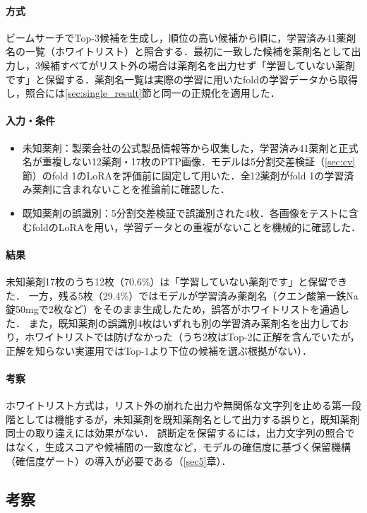 \documentclass[dvipdfmx]{jsarticle}
\begin{document}
\paragraph{方式}
ビームサーチでTop-3候補を生成し，順位の高い候補から順に，学習済み41薬剤名の一覧（ホワイトリスト）と照合する．最初に一致した候補を薬剤名として出力し，3候補すべてがリスト外の場合は薬剤名を出力せず「学習していない薬剤です」と保留する．薬剤名一覧は実際の学習に用いたfoldの学習データから取得し，照合には\ref{sec:single_result}節と同一の正規化を適用した．

\paragraph{入力・条件}
\begin{itemize}
  \item 未知薬剤：製薬会社の公式製品情報等から収集した，学習済み41薬剤と正式名が重複しない12薬剤・17枚のPTP画像．モデルは5分割交差検証（\ref{sec:cv}節）のfold 1のLoRAを評価前に固定して用いた．全12薬剤がfold 1の学習済み薬剤に含まれないことを推論前に確認した．
  \item 既知薬剤の誤識別：5分割交差検証で誤識別された4枚．各画像をテストに含むfoldのLoRAを用い，学習データとの重複がないことを機械的に確認した．
\end{itemize}

\paragraph{結果}
未知薬剤17枚のうち12枚（70.6\%）は「学習していない薬剤です」と保留できた．
一方，残る5枚（29.4\%）ではモデルが学習済み薬剤名（クエン酸第一鉄Na錠50mgで2枚など）をそのまま生成したため，誤答がホワイトリストを通過した．
また，既知薬剤の誤識別4枚はいずれも別の学習済み薬剤名を出力しており，ホワイトリストでは防げなかった（うち2枚はTop-2に正解を含んでいたが，正解を知らない実運用ではTop-1より下位の候補を選ぶ根拠がない）．

\paragraph{考察}
ホワイトリスト方式は，リスト外の崩れた出力や無関係な文字列を止める第一段階としては機能するが，未知薬剤を既知薬剤名として出力する誤りと，既知薬剤同士の取り違えには効果がない．
誤断定を保留するには，出力文字列の照合ではなく，生成スコアや候補間の一致度など，モデルの確信度に基づく保留機構（確信度ゲート）の導入が必要である（\ref{sec5}章）．

\subsection{考察}
\end{document}

